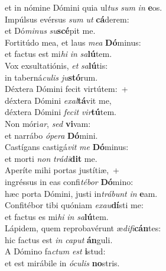 \evenverse et in nómine Dómini quia ul\textit{tus} \textit{sum} \textit{in} \textbf{e}os.\\
\oddverse Impúlsus evérsus \textit{sum} \textit{ut} \textbf{cá}derem:~\*\\
\oddverse et Dó\textit{mi}\textit{nus} \textit{su}\textbf{scé}pit me.\\
\evenverse Fortitúdo mea, et laus \textit{me}\textit{a} \textbf{Dó}minus:~\*\\
\evenverse et factus est mi\textit{hi} \textit{in} \textit{sa}\textbf{lú}tem.\\
\oddverse Vox exsultatiónis, \textit{et} \textit{sa}\textbf{lú}tis:~\*\\
\oddverse in taberná\textit{cu}\textit{lis} \textit{ju}\textbf{stó}rum.\\
\evenverse Déxtera Dómini fecit virtútem:~+\\
\evenverse  déxtera Dómini \textit{e}\textit{xal}\textbf{tá}vit me,~\*\\
\evenverse déxtera Dómini \textit{fe}\textit{cit} \textit{vir}\textbf{tú}tem.\\
\oddverse Non móri\textit{ar}, \textit{sed} \textbf{vi}vam:~\*\\
\oddverse et narrábo \textit{ó}\textit{pe}\textit{ra} \textbf{Dó}mini.\\
\evenverse Castígans castigá\textit{vit} \textit{me} \textbf{Dó}minus:~\*\\
\evenverse et morti \textit{non} \textit{trá}\textit{di}\textbf{dit} me.\\
\oddverse Aperíte mihi portas justítiæ,~+\\
\oddverse  ingréssus in eas confi\textit{té}\textit{bor} \textbf{Dó}mino:~\*\\
\oddverse hæc porta Dómini, justi in\textit{trá}\textit{bunt} \textit{in} \textbf{e}am.\\
\evenverse Confitébor tibi quóniam \textit{e}\textit{xau}\textbf{dí}sti me:~\*\\
\evenverse et factus es mi\textit{hi} \textit{in} \textit{sa}\textbf{lú}tem.\\
\oddverse Lápidem, quem reprobavérunt æ\textit{di}\textit{fi}\textbf{cán}tes:~\*\\
\oddverse hic factus est \textit{in} \textit{ca}\textit{put} \textbf{án}guli.\\
\evenverse A Dómino fa\textit{ctum} \textit{est} \textbf{i}stud:~\*\\
\evenverse et est mirábile in \textit{ó}\textit{cu}\textit{lis} \textbf{no}stris.\\
